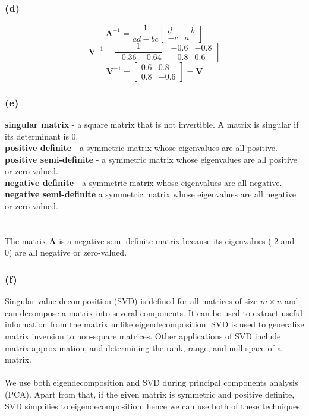 \documentclass{article}[a4paper]
\newcommand{\vect}[1]{\boldsymbol{#1}}
\begin{document}
\subsubsection*{(d)}
\[
\vect{A}^{-1} = 
    \frac{1}{ad-bc}
    \begin{bmatrix}
       d & -b \\ 
       -c & a
    \end{bmatrix}
\]
\[
\vect{V}^{-1} = \frac{1}{-0.36-0.64}
    \begin{bmatrix}
       -0.6 & -0.8 \\ 
       -0.8 & 0.6
    \end{bmatrix}
\]
\[
\vect{V}^{-1} = 
    \begin{bmatrix}
       0.6 & 0.8 \\ 
       0.8 & -0.6
    \end{bmatrix} = \vect{V}
\]
\subsubsection*{(e)}
\textbf{singular matrix} - a square matrix that is not invertible. A matrix is singular if its determinant is 0.\\
\textbf{positive definite} - a symmetric matrix whose eigenvalues are all positive.\\
\textbf{positive semi-definite} - a symmetric matrix whose eigenvalues are all positive or zero valued.\\
\textbf{negative definite} - a symmetric matrix whose eigenvalues are all negative.\\
\textbf{negative semi-definite} a symmetric matrix whose eigenvalues are all negative or zero valued.\\
\\~\\
The matrix $\vect{A}$ is a negative semi-definite matrix because its eigenvalues (-2 and 0) are all negative or zero-valued.
\subsubsection*{(f)}

Singular value decomposition (SVD) is defined for all matrices of size $m \times n$ and can decompose a matrix into several components. It can be used to extract useful information from the matrix unlike eigendecomposition. SVD is used to generalize matrix inversion to non-square matrices. Other applications of SVD include matrix approximation, and determining the rank, range, and null space of a matrix.
\\~\\
We use both eigendecomposition and SVD during principal components analysis (PCA). Apart from that, if the given matrix is symmetric and positive definite, SVD simplifies to eigendecomposition, hence we can use both of these techniques.
\end{document}
